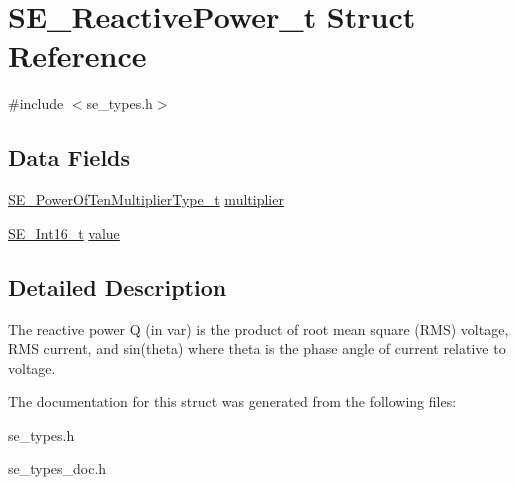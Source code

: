 \hypertarget{structSE__ReactivePower__t}{}\section{S\+E\+\_\+\+Reactive\+Power\+\_\+t Struct Reference}
\label{structSE__ReactivePower__t}


{\ttfamily \#include $<$se\+\_\+types.\+h$>$}

\subsection*{Data Fields}
\begin{DoxyCompactItemize}
\item 
\hyperlink{group__PowerOfTenMultiplierType_gaf0317b781dc8dbb9cb6ac4e44a14fdef}{S\+E\+\_\+\+Power\+Of\+Ten\+Multiplier\+Type\+\_\+t} \hyperlink{group__ReactivePower_ga98dc0843c7fc3a2685dfee658053c5a8}{multiplier}
\item 
\hyperlink{group__Int16_ga0d600c7df811a7d4b4816e8965877690}{S\+E\+\_\+\+Int16\+\_\+t} \hyperlink{group__ReactivePower_ga560149c35f951e26080f1c5445e5e344}{value}
\end{DoxyCompactItemize}


\subsection{Detailed Description}
The reactive power Q (in var) is the product of root mean square (R\+MS) voltage, R\+MS current, and sin(theta) where theta is the phase angle of current relative to voltage. 

The documentation for this struct was generated from the following files\+:\begin{DoxyCompactItemize}
\item 
se\+\_\+types.\+h\item 
se\+\_\+types\+\_\+doc.\+h\end{DoxyCompactItemize}
